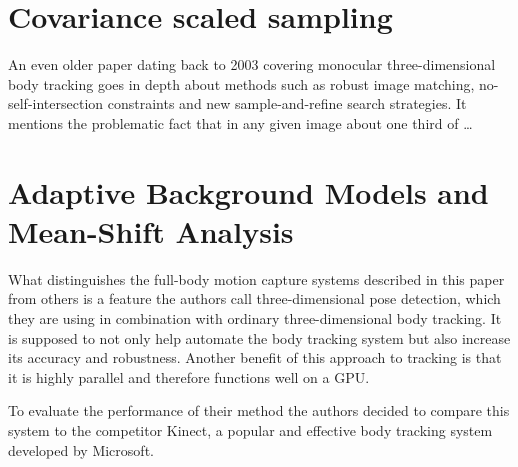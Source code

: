 \section{Covariance scaled sampling}
An even older paper dating back to 2003 covering monocular three-dimensional body tracking goes in depth about methods such as robust image matching, no-self-intersection
constraints and new sample-and-refine search strategies. It mentions the problematic fact that in any given image about one third of … \cite{Covariance-scaled-sampling}

\section{Adaptive Background Models and Mean-Shift Analysis}
What distinguishes the full-body motion capture systems described in this paper from others is a feature the authors call three-dimensional pose detection, which they are using
in combination with ordinary three-dimensional body tracking. It is supposed to not only help automate the body tracking system but also increase its accuracy and robustness.
Another benefit of this approach to tracking is that it is highly parallel and therefore functions well on a GPU. \cite{Adaptive-background-models}

To evaluate the performance of their method the authors decided to compare this system to the competitor Kinect, a popular and effective body tracking system developed by Microsoft.